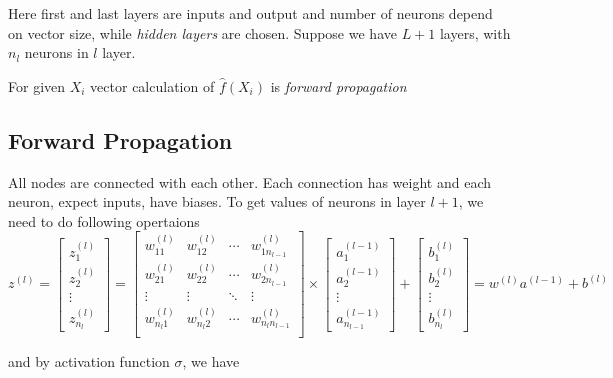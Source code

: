 \documentclass{article}
\numberwithin{equation}{section}
\theoremstyle{definition}
\theoremstyle{remark}
\begin{document}


\noindent
Here first and last layers are inputs and output and number of neurons depend on vector size, while \textit{hidden layers} are chosen. Suppose we have $L+1$ layers, with $n_{l}$ neurons in $l$ layer.

For given $X_i$ vector calculation of $\hat{f} \left( X_i \right)$ is \textit{forward propagation}




\subsection{Forward Propagation}



All nodes are connected with each other. Each connection has weight and each neuron, expect inputs, have biases. To get values of neurons in layer $l+1$, we need to do following opertaions
\[
    z^{(l)} =
    \begin{bmatrix}
        z_{1}^{(l)} \\
        z_{2}^{(l)} \\
        \vdots \\
        z_{n_{l}}^{(l)}
    \end{bmatrix} =
    \begin{bmatrix}
        w_{11}^{(l)} & w_{12}^{(l)} & \cdots & w_{1n_{l-1}}^{(l)} \\
        w_{21}^{(l)} & w_{22}^{(l)} & \cdots & w_{2n_{l-1}}^{(l)} \\
        \vdots & \vdots & \ddots & \vdots \\
        w_{n_{l}1}^{(l)} & w_{n_{l}2}^{(l)} & \cdots & w_{n_{l}n_{l-1}}^{(l)} \\
    \end{bmatrix} \times
    \begin{bmatrix}
        a_{1}^{(l-1)} \\
        a_{2}^{(l-1)} \\
        \vdots \\
        a_{n_{l-1}}^{(l-1)}
    \end{bmatrix} +
    \begin{bmatrix}
        b_{1}^{(l)} \\
        b_{2}^{(l)} \\
        \vdots \\
        b_{n_{l}}^{(l)}
    \end{bmatrix}
    = w^{(l)} a^{(l-1)} + b^{(l)}
\]

\noindent
and by activation function $\sigma$, we have
\end{document}
